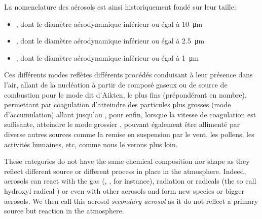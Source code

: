 La nomenclature des aérosols est ainsi historiquement fondé sur leur taille:
\begin{itemize}
    \item \PMdix, dont le diamètre aérodynamique inférieur ou égal à \SI{10}{\um}
    \item \PMdc, dont le diamètre aérodynamique inférieur ou égal à \SI{2.5}{\um}
    \item \PMun, dont le diamètre aérodynamique inférieur ou égal à \SI{1}{\um}
\end{itemize}

Ces différents modes reflètes différents procédés conduisant à leur présence dans l'air,
allant de la nucléation à partir de composé gaseux ou de source de combustion pour le mode
dit d'Aikten, le plus fins (prépondérant en nombre), permettant par coagulation
d'atteindre des particules plus grosses (mode d'accumulation) allant jusqu'au \PMdc, pour
enfin, lorsque la vitesse de coagulation est suffisante, atteindre le mode grossier
\PMdix, pouvant également être allimenté par diverse autres sources comme la remise en
suspension par le vent, les pollens, les activités humaines, etc, comme nous le verons
plus loin.

These categories do not have the same
chemical composition nor shape as they reflect different source or different process in
place in the atmosphere. Indeed, aerosols can react with the gas (,
,  for instance), radiation or radicals (the so call hydroxyl radical
) or even with other aerosols and form new species or bigger aerosols. We then
call this aerosol \emph{secondary aerosol} as it do not reflect a primary source but
reaction in the atmosphere.

